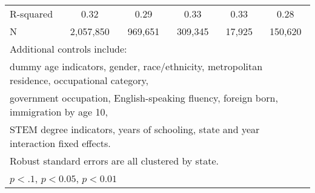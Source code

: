\begin{table}[htbp]
\begin{tabular}{l*{5}{c}}
R-squared           &        0.32         &        0.29         &        0.33         &        0.33         &        0.28         \\
N                   &   2,057,850         &     969,651         &     309,345         &      17,925         &     150,620         \\
\bottomrule
\multicolumn{6}{l}{\footnotesize Additional controls include:}\\
\multicolumn{6}{l}{\footnotesize dummy age indicators, gender, race/ethnicity, metropolitan residence, occupational category,}\\
\multicolumn{6}{l}{\footnotesize government occupation, English-speaking fluency, foreign born, immigration by age 10,}\\
\multicolumn{6}{l}{\footnotesize STEM degree indicators, years of schooling, state and year interaction fixed effects.}\\
\multicolumn{6}{l}{\footnotesize Robust standard errors are all clustered by state.}\\
\multicolumn{6}{l}{\footnotesize \sym{*} \(p<.1\), \sym{**} \(p<0.05\), \sym{***} \(p<0.01\)}\\
\end{tabular}
\end{table}
